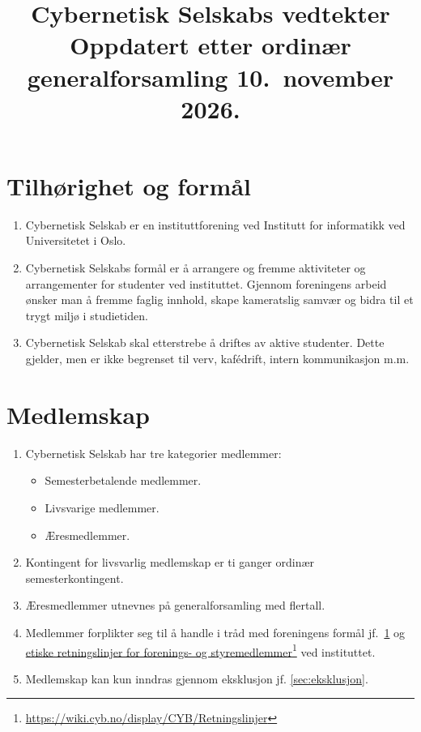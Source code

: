 \documentclass[8pt,norsk,a4paper]{article}
\title{\textbf{Cybernetisk Selskabs vedtekter} \\
	{\large Oppdatert etter ordinær generalforsamling 10.~november 2026.}}
\date{}
\author{}
\newcommand\fhref[2]{%
	\href{#1}{#2}\footnote{\url{#1}}%
}
\begin{document}
\maketitle{}

\section{Tilhørighet og formål}\label{sec:formaal}
\begin{enumerate}
	\item{Cybernetisk Selskab er en instituttforening ved Institutt for informatikk ved Universitetet i Oslo.}
	\item{Cybernetisk Selskabs formål er å arrangere og fremme aktiviteter og arrangementer for studenter ved instituttet. Gjennom foreningens arbeid ønsker man å fremme faglig innhold, skape kameratslig samvær og bidra til et trygt miljø i studietiden.}
	\item{Cybernetisk Selskab skal etterstrebe å driftes av aktive studenter. Dette gjelder, men er ikke begrenset til verv, kafédrift, intern kommunikasjon m.m.}
\end{enumerate}

\section{Medlemskap}\label{sec:medlemskap}
\begin{enumerate}
	\item{Cybernetisk Selskab har tre kategorier medlemmer:}
	\begin{itemize}
		\item{Semesterbetalende medlemmer.}
		\item{Livsvarige medlemmer.}
		\item{Æresmedlemmer.}
	\end{itemize}
	\item{Kontingent for livsvarlig medlemskap er ti ganger ordinær semesterkontingent.}
	\item{Æresmedlemmer utnevnes på generalforsamling med  flertall.}
	\item Medlemmer forplikter seg til å handle i tråd med foreningens formål jf.~\ref{sec:formaal} og \fhref{https://wiki.cyb.no/display/CYB/Retningslinjer}{etiske retningslinjer for forenings- og styremedlemmer} ved instituttet\footnotemark.\label{item:forpliktelser}
	\item Medlemskap kan kun inndras gjennom eksklusjon jf. \ref{sec:eksklusjon}.
\end{enumerate}
\end{document}
